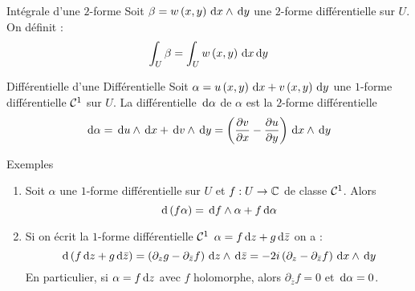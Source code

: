\documentclass{cours}
\begin{document}
\begin{définition}{Intégrale d'une $2$-forme}{}
    Soit $\beta = w\left(x, y\right){\rm \, d} x \land {\rm \, d} y$ une $2$-forme différentielle sur $U$. On définit : 
    \begin{equation*}
        \int_{U}\beta = \int_{U}w\left(x, y\right){\rm \, d} x{\rm \, d} y
    \end{equation*}
\end{définition}
\begin{définition}{Différentielle d'une Différentielle}{}
    Soit $\alpha = u\left(x, y\right){\rm \, d} x + v\left(x, y\right){\rm \, d} y$ une $1$-forme différentielle $\mathcal{C}^{1}$ sur $U$. La différentielle ${\rm \, d} \alpha$ de $\alpha$ est la $2$-forme différentielle 
    \begin{equation*}
        {\rm \, d} \alpha = {\rm \, d} u\land {\rm \, d} x + {\rm \, d} v \land {\rm \, d} y = \left(\frac{\partial v}{\partial x} - \frac{\partial u}{\partial y}\right){\rm \, d} x \land {\rm \, d} y 
    \end{equation*}
\end{définition}

\begin{propositionfr}{Exemples}{}
    \begin{enumerate}
        \item Soit $\alpha$ une $1$-forme différentielle sur $U$ et $f : U\to \mathbb{C}$ de classe $\mathcal{C}^{1}$. Alors 
        \begin{equation*}
            {\rm \, d}\left(f\alpha\right) = {\rm \, d} f \land \alpha + f{\rm \, d} \alpha
        \end{equation*}
        \item Si on écrit la $1$-forme différentielle $\mathcal{C}^{1}$ $\alpha = f{\rm \, d} z + g{\rm \, d} \bar{z}$ on a : 
        \begin{equation*}
            {\rm \, d}\left(f{\rm \, d} z + g {\rm \, d}\bar{z}\right) = \left(\partial_{z}g - \partial_{\bar{z}}f\right) {\rm \, d} z \land {\rm \, d}\bar{z} = -2i\left(\partial_{z}-\partial_{\bar{z}}f\right){\rm \, d} x \land {\rm \, d} y
        \end{equation*}
        En particulier, si $\alpha = f{\rm \, d} z$ avec $f$ holomorphe, alors $\partial_{\bar{z}}f = 0$ et ${\rm \, d} \alpha = 0$. 
    \end{enumerate}
\end{propositionfr}
\end{document}
